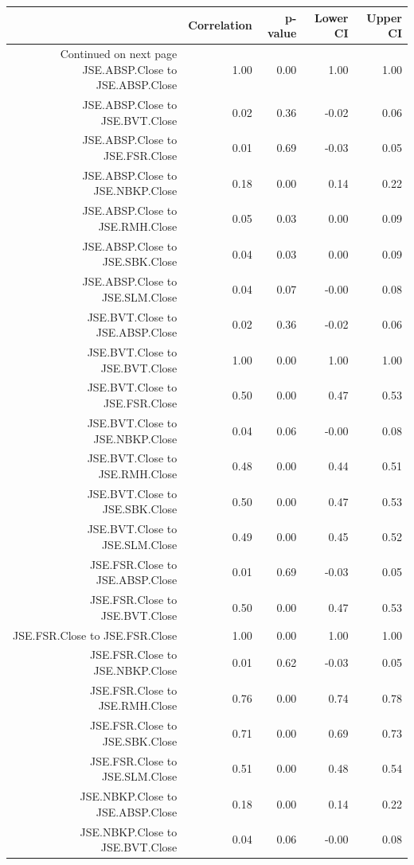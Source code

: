 \documentclass[11pt,preprint, authoryear]{elsarticle}
\numberwithin{equation}{section}
\numberwithin{figure}{section}
\numberwithin{table}{section}
\begin{document}
\begin{longtable}{rrrrr}
  \toprule
 & Correlation & p-value & Lower CI & Upper CI \\ 
  \hline 
\endhead 
\hline 
{\footnotesize Continued on next page} 
\endfoot 
\endlastfoot 
 \midrule
JSE.ABSP.Close to JSE.ABSP.Close & 1.00 & 0.00 & 1.00 & 1.00 \\ 
  JSE.ABSP.Close to JSE.BVT.Close & 0.02 & 0.36 & -0.02 & 0.06 \\ 
  JSE.ABSP.Close to JSE.FSR.Close & 0.01 & 0.69 & -0.03 & 0.05 \\ 
  JSE.ABSP.Close to JSE.NBKP.Close & 0.18 & 0.00 & 0.14 & 0.22 \\ 
  JSE.ABSP.Close to JSE.RMH.Close & 0.05 & 0.03 & 0.00 & 0.09 \\ 
  JSE.ABSP.Close to JSE.SBK.Close & 0.04 & 0.03 & 0.00 & 0.09 \\ 
  JSE.ABSP.Close to JSE.SLM.Close & 0.04 & 0.07 & -0.00 & 0.08 \\ 
  JSE.BVT.Close to JSE.ABSP.Close & 0.02 & 0.36 & -0.02 & 0.06 \\ 
  JSE.BVT.Close to JSE.BVT.Close & 1.00 & 0.00 & 1.00 & 1.00 \\ 
  JSE.BVT.Close to JSE.FSR.Close & 0.50 & 0.00 & 0.47 & 0.53 \\ 
  JSE.BVT.Close to JSE.NBKP.Close & 0.04 & 0.06 & -0.00 & 0.08 \\ 
  JSE.BVT.Close to JSE.RMH.Close & 0.48 & 0.00 & 0.44 & 0.51 \\ 
  JSE.BVT.Close to JSE.SBK.Close & 0.50 & 0.00 & 0.47 & 0.53 \\ 
  JSE.BVT.Close to JSE.SLM.Close & 0.49 & 0.00 & 0.45 & 0.52 \\ 
  JSE.FSR.Close to JSE.ABSP.Close & 0.01 & 0.69 & -0.03 & 0.05 \\ 
  JSE.FSR.Close to JSE.BVT.Close & 0.50 & 0.00 & 0.47 & 0.53 \\ 
  JSE.FSR.Close to JSE.FSR.Close & 1.00 & 0.00 & 1.00 & 1.00 \\ 
  JSE.FSR.Close to JSE.NBKP.Close & 0.01 & 0.62 & -0.03 & 0.05 \\ 
  JSE.FSR.Close to JSE.RMH.Close & 0.76 & 0.00 & 0.74 & 0.78 \\ 
  JSE.FSR.Close to JSE.SBK.Close & 0.71 & 0.00 & 0.69 & 0.73 \\ 
  JSE.FSR.Close to JSE.SLM.Close & 0.51 & 0.00 & 0.48 & 0.54 \\ 
  JSE.NBKP.Close to JSE.ABSP.Close & 0.18 & 0.00 & 0.14 & 0.22 \\ 
  JSE.NBKP.Close to JSE.BVT.Close & 0.04 & 0.06 & -0.00 & 0.08 \\ 

\end{longtable}
\end{document}
